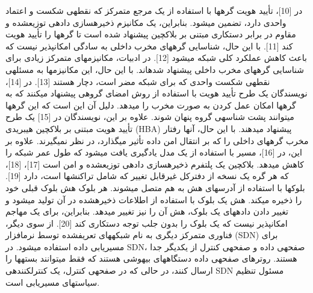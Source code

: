 \documentclass{article} %
\begin{document}
\noindent در [10]، تأیید هویت گرهها با استفاده از یک مرجع متمرکز که نقطهی شکست و اعتماد واحدی دارد، تضمین میشود. بنابراین، یک مکانیزم ذخیرهسازی دادهی توزیعشده و مقاوم در برابر دستکاری مبتنی بر بلاکچین پیشنهاد شده است تا گرهها را تأیید هویت کند [11]. با این حال، شناسایی گرههای مخرب داخلی به سادگی امکانپذیر نیست که باعث کاهش عملکرد کلی شبکه میشود [12]. در ادبیات، مکانیزمهای متمرکز زیادی برای شناسایی گرههای مخرب داخلی پیشنهاد شدهاند. با این حال، این مکانیزمها به مسئلهی نقطهی شکست واحدی که برای شبکه مضر است، دچار هستند [13]. در [14]، نویسندگان یک طرح تأیید هویت با استفاده از روش امضای گروهی پیشنهاد میکنند که به گرهها امکان عمل کردن به صورت مخرب را میدهد. دلیل آن این است که این گرهها میتوانند پشت شناسهی گروه پنهان شوند. علاوه بر این، نویسندگان در [15] یک طرح تأیید هویت مبتنی بر بلاکچین هیبریدی (HBA) پیشنهاد میدهند. با این حال، آنها رفتار مخرب گرههای داخلی را که بر انتقال امن داده تأثیر میگذارد، در نظر نمیگیرند. علاوه بر این، در [16]، مسیر با استفاده از یک مدل یادگیری یافت میشود که طول عمر شبکه را کاهش میدهد. بلاکچین یک پلتفرم ذخیرهسازی دادهی توزیعشده و امن است [17]، [18]، که هر گره یک نسخه از دفترکل غیرقابل تغییر که شامل تراکنشها است، دارد [19]. بلوکها با استفاده از آدرسهای هش به هم متصل میشوند. هر بلوک هش بلوک قبلی خود را ذخیره میکند. هش یک بلوک با استفاده از اطلاعات ذخیرهشده در آن تولید میشود و تغییر دادن دادههای یک بلوک، هش آن را نیز تغییر میدهد. بنابراین، برای یک مهاجم امکانپذیر نیست که یک بلوک را بدون جلب توجه دستکاری کند [20]. از سوی دیگر، فناوری متمرکز دیگری به نام شبکههای تعریفشده توسط نرمافزار (SDN) برای مسیریابی داده استفاده میشود. در SDN، صفحهی داده و صفحهی کنترل از یکدیگر جدا هستند. روترهای صفحهی داده دستگاههای بیهوشی هستند که فقط میتوانند بستهها را ارسال کنند، در حالی که در صفحهی کنترل، یک کنترلکنندهی SDN مسئول تنظیم سیاستهای مسیریابی است.\textbf{}
\end{document}
